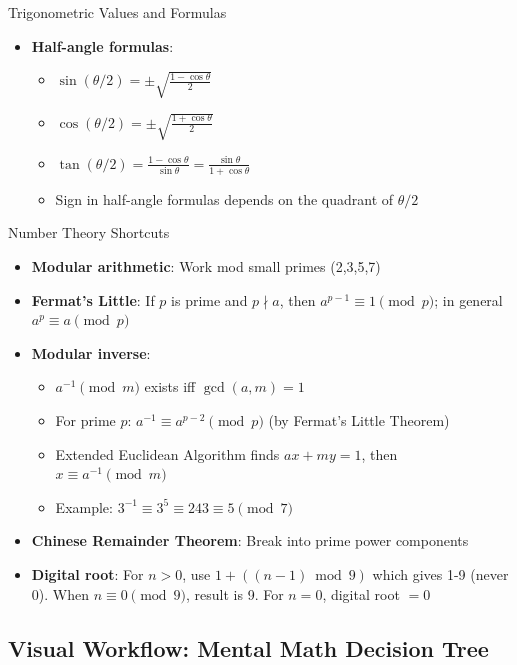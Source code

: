 \documentclass{article}
\begin{document}
\begin{mentalbox}{Trigonometric Values and Formulas}
\begin{itemize}
\begin{itemize}[nosep]
   \item $\cos(2\theta) = \cos^2\theta - \sin^2\theta = 1 - 2\sin^2\theta = 2\cos^2\theta - 1$
   \end{itemize}
\item \textbf{Half-angle formulas}:
   \begin{itemize}[nosep]
   \item $\sin(\theta/2) = \pm\sqrt{\frac{1-\cos\theta}{2}}$
   \item $\cos(\theta/2) = \pm\sqrt{\frac{1+\cos\theta}{2}}$
     \item $\tan(\theta/2) = \frac{1-\cos\theta}{\sin\theta} = \frac{\sin\theta}{1+\cos\theta}$
  \item Sign in half-angle formulas depends on the quadrant of $\theta/2$
  \end{itemize}
\end{itemize}
\end{mentalbox}

\begin{mentalbox}{Number Theory Shortcuts}
\begin{itemize}
\item \textbf{Modular arithmetic}: Work mod small primes (2,3,5,7)
\item \textbf{Fermat's Little}: If $p$ is prime and $p\nmid a$, then $a^{p-1}\equiv1\pmod p$; in general $a^p\equiv a\pmod p$
\item \textbf{Modular inverse}: 
   \begin{itemize}[nosep]
   \item $a^{-1} \pmod m$ exists iff $\gcd(a,m) = 1$
   \item For prime $p$: $a^{-1} \equiv a^{p-2} \pmod p$ (by Fermat's Little Theorem)
   \item Extended Euclidean Algorithm finds $ax + my = 1$, then $x \equiv a^{-1} \pmod m$
   \item Example: $3^{-1} \equiv 3^{5} \equiv 243 \equiv 5 \pmod 7$
   \end{itemize}
\item \textbf{Chinese Remainder Theorem}: Break into prime power components
\item \textbf{Digital root}: For $n>0$, use $1+((n-1)\bmod 9)$ which gives 1-9 (never 0). When $n\equiv 0\pmod 9$, result is 9. For $n=0$, digital root $=0$
\end{itemize}
\end{mentalbox}

\subsection{Visual Workflow: Mental Math Decision Tree}
\end{document}
